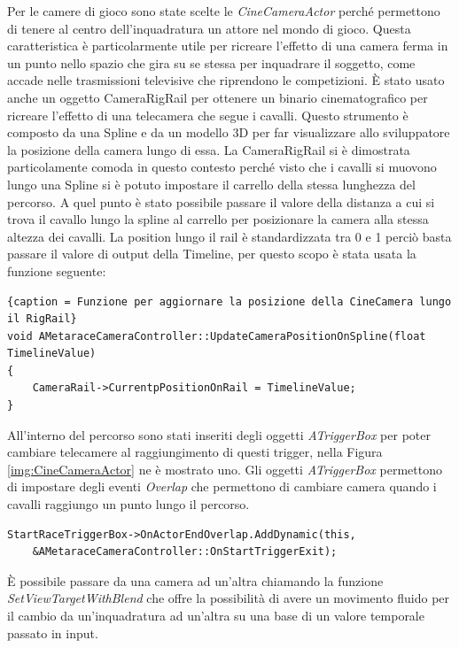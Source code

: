     Per le camere di gioco sono state scelte le \textit{CineCameraActor} perché permettono di tenere al centro dell'inquadratura un attore nel mondo di gioco.
    Questa caratteristica è particolarmente utile per ricreare l'effetto di una camera ferma in un punto nello spazio che gira su se stessa per inquadrare il soggetto, come accade nelle trasmissioni televisive che riprendono le competizioni.
    È stato usato anche un oggetto CameraRigRail per ottenere un binario cinematografico per ricreare l'effetto di una telecamera che segue i cavalli.
    Questo strumento è composto da una Spline e da un modello 3D per far visualizzare allo sviluppatore la posizione della camera lungo di essa.
    La CameraRigRail si è dimostrata particolamente comoda in questo contesto perché visto che i cavalli si muovono lungo una Spline si è potuto impostare il carrello della stessa lunghezza del percorso.
    A quel punto è stato possibile passare il valore della distanza a cui si trova il cavallo lungo la spline al carrello per posizionare la camera alla stessa altezza dei cavalli.
    La position lungo il rail è standardizzata tra 0 e 1 perciò basta passare il valore di output della Timeline, per questo scopo è stata usata la funzione seguente:

    \begin{lstlisting}{caption = Funzione per aggiornare la posizione della CineCamera lungo il RigRail}
void AMetaraceCameraController::UpdateCameraPositionOnSpline(float TimelineValue)
{
    CameraRail->CurrentpPositionOnRail = TimelineValue;
}
    \end{lstlisting}

    All'interno del percorso sono stati inseriti degli oggetti \textit{ATriggerBox} per poter cambiare telecamere al raggiungimento di questi trigger, nella Figura \ref{img:CineCameraActor} ne è mostrato uno.
    Gli oggetti \textit{ATriggerBox} permettono di impostare degli eventi \textit{Overlap} che permettono di cambiare camera quando i cavalli raggiungo un punto lungo il percorso.

    \begin{lstlisting}[caption = {Chiamata per l'aggiunta di una funzione all'evento overlap di un \textit{TriggerBox}}]
StartRaceTriggerBox->OnActorEndOverlap.AddDynamic(this, 
    &AMetaraceCameraController::OnStartTriggerExit);
    \end{lstlisting}

    È possibile passare da una camera ad un'altra chiamando la funzione \textit{SetViewTargetWithBlend} che offre la possibilità di avere un movimento fluido per il cambio da un'inquadratura ad un'altra su una base di un valore temporale passato in input.

